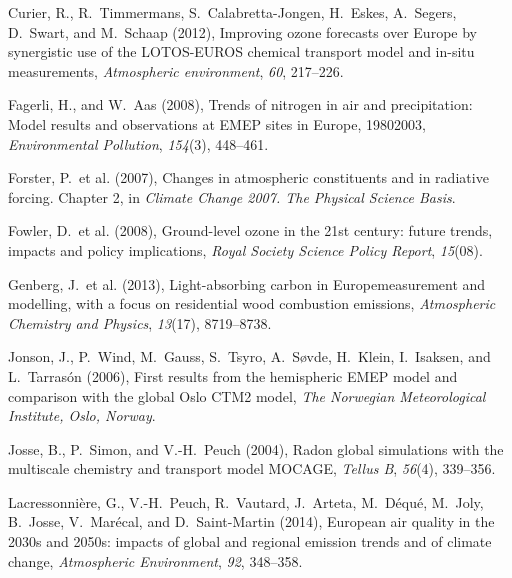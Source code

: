\documentclass[9pt]{report}
\begin{document}
{\begin{thebibliography}{28}
\mdbibitemlabel{}Curier, R., R.~Timmermans, S.~Calabretta-Jongen, H.~Eskes, A.~Segers, D.~Swart, and M.~Schaap (2012), Improving ozone forecasts over Europe by synergistic use of the LOTOS-EUROS chemical transport model and in-situ measurements, \emph{Atmospheric environment}, \emph{60}, 217–226.\label{curier2012improving}%

\mdbibitemlabel{}Fagerli, H., and W.~Aas (2008), Trends of nitrogen in air and precipitation: Model results and observations at EMEP sites in Europe, 1980\textendash{}2003, \emph{Environmental Pollution}, \emph{154}(3), 448–461.\label{fagerli2008trends}%

\mdbibitemlabel{}Forster, P.~et al. (2007), Changes in atmospheric constituents and in radiative forcing. Chapter 2, in \emph{Climate Change 2007. The Physical Science Basis}.\label{forster2007changes}%

\mdbibitemlabel{}Fowler, D.~et al. (2008), Ground-level ozone in the 21st century: future trends, impacts and policy implications, \emph{Royal Society Science Policy Report}, \emph{15}(08).\label{fowler2008ground}%

\mdbibitemlabel{}Genberg, J.~et al. (2013), Light-absorbing carbon in Europe\textendash{}measurement and modelling, with a focus on residential wood combustion emissions, \emph{Atmospheric Chemistry and Physics}, \emph{13}(17), 8719–8738.\label{genberg2013light}%

\mdbibitemlabel{}Jonson, J., P.~Wind, M.~Gauss, S.~Tsyro, A.~S\o{}vde, H.~Klein, I.~Isaksen, and L.~Tarras\'{o}n (2006), First results from the hemispheric EMEP model and comparison with the global Oslo CTM2 model, \emph{The Norwegian Meteorological Institute, Oslo, Norway}.\label{jonson2006first}%

\mdbibitemlabel{}Josse, B., P.~Simon, and V.-H.~Peuch (2004), Radon global simulations with the multiscale chemistry and transport model MOCAGE, \emph{Tellus B}, \emph{56}(4), 339–356.\label{josse2004radon}%

\mdbibitemlabel{}Lacressonni\`{e}re, G., V.-H.~Peuch, R.~Vautard, J.~Arteta, M.~D\'{e}qu\'{e}, M.~Joly, B.~Josse, V.~Mar\'{e}cal, and D.~Saint-Martin (2014), European air quality in the 2030s and 2050s: impacts of global and regional emission trends and of climate change, \emph{Atmospheric Environment}, \emph{92}, 348–358.\label{lacressonniere2014european}%


\end{thebibliography}}
\end{document}
